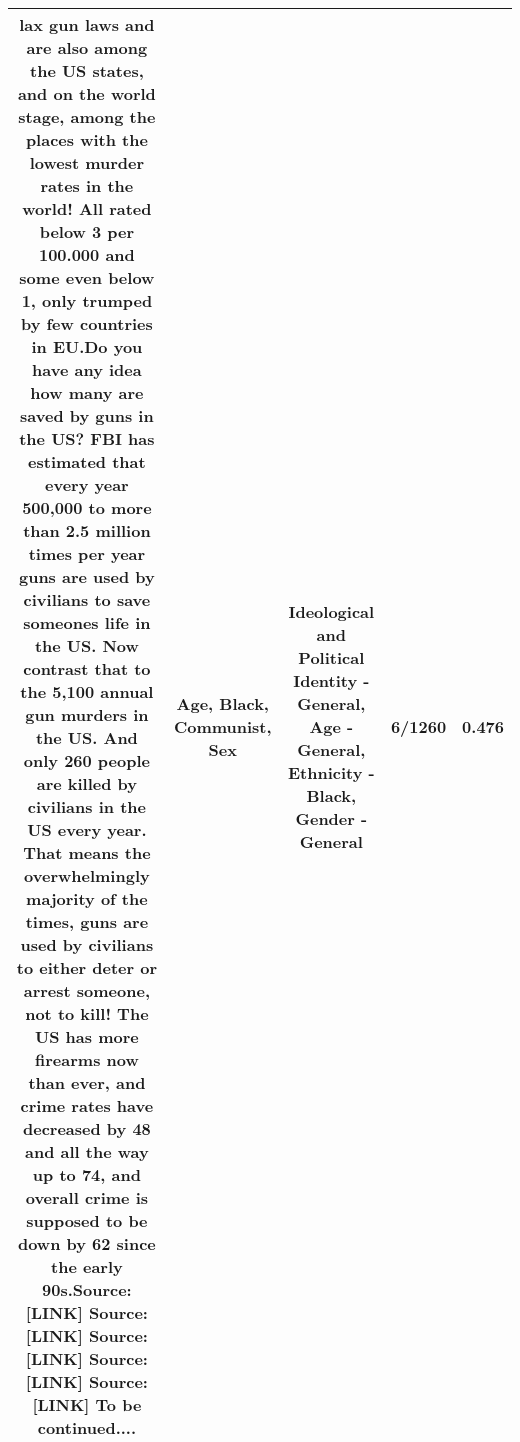 \documentclass[11pt]{article}
\newlength\mylength
\begin{document}
\begin{center}
\begin{longtable}{|C{.65\mylength}|C{.30\mylength}|C{.12\mylength}|C{.12\mylength}|C{.12\mylength}|}
lax gun laws and are also among the US states, and on the world stage, among the places with the lowest murder rates in the world! All rated below 3 per 100.000 and some even below 1, only trumped by few countries in EU.Do you have any idea how many are saved by guns in the US? FBI has estimated that every year 500,000 to more than 2.5 million times per year guns are used by civilians to save someones life in the US. Now contrast that to the 5,100 annual gun murders in the US. And only 260 people are killed by civilians in the US every year. That means the overwhelmingly majority of the times, guns are used by civilians to either deter or arrest someone, not to kill! The US has more firearms now than ever, and crime rates have decreased by 48 and all the way up to 74, and overall crime is supposed to be down by 62 since the early 90s.Source:  [LINK] Source:  [LINK] Source:  [LINK] Source:  [LINK] Source:  [LINK] To be continued....\normalsize   & Age, Black, Communist, Sex &  Ideological and Political Identity - General, Age - General, Ethnicity - Black, Gender - General & 6/1260 & 0.476 \\  \hline

\end{longtable}
\end{center}
\end{document}
